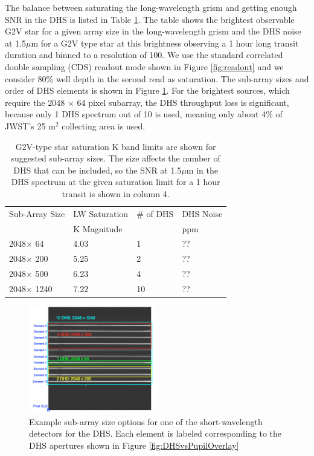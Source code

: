 \documentclass[iop]{emulateapj}
\begin{document}
The balance between saturating the long-wavelength grism and getting enough SNR in the DHS is listed in Table \ref{tab:SatSNRsubA}.
The table shows the brightest observable G2V star  for a given array size in the long-wavelength grism and the DHS noise at 1.5$\mu$m for a G2V type star at this brightness observing a 1 hour long transit duration and binned to a resolution of 100.
We use the standard correlated double sampling (CDS) readout mode shown in Figure \ref{fig:readout} and we consider 80\% well depth in the second read as saturation.
The sub-array sizes and order of DHS elements is shown in Figure \ref{fig:DHSaps}.
For the brightest sources, which require the 2048 $\times$ 64 pixel subarray, the DHS throughput loss is significant, because only 1 DHS spectrum out of 10 is used, meaning only about 4\% of JWST's 25 m$^2$ collecting area is used.

\begin{table}
\centering
\begin{tabular}{llll}
Sub-Array Size &  LW Saturation & \# of DHS & DHS Noise\\
                         &  K Magnitude    &                               & ppm \\
\hline \hline
2048$\times$ 64 & 4.03 & 1 &  ?? \\
2048$\times$ 200 & 5.25 & 2 &  ?? \\
2048$\times$ 500 & 6.23 & 4 &  ?? \\
2048$\times$ 1240 & 7.22 & 10 & ??
\end{tabular}
\caption{G2V-type star saturation K band limits are shown for suggested sub-array sizes.
The size affects the number of DHS that can be included, so the SNR at 1.5$\mu$m in the DHS spectrum at the given saturation limit for a 1 hour transit is shown in column 4.}\label{tab:SatSNRsubA}
\end{table}

\begin{figure}[!ht]
\includegraphics[width=0.5\textwidth]{example_ap_sizes.png}
\caption{Example sub-array size options for one of the short-wavelength detectors for the DHS.
Each element is labeled corresponding to the DHS apertures shown in Figure \ref{fig:DHSvsPupilOverlay}}\label{fig:DHSaps}
\end{figure}
\end{document}
